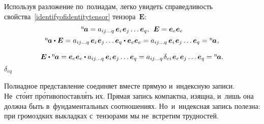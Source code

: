 \begin{otherlanguage}{russian}
Используя разложение по~полиадам, легко увидеть справедливость свойства~\eqref{identifyofidentitytensor}  тензора~$\bm{E}$:
\vspace{0.1em}\[\begin{array}{c}
{^\mathrm{n}\hspace{-0.2ex}\bm{a}} = a_{ij \ldots q} \hspace{0.4ex} \bm{e}_i \hspace{0.2ex} \bm{e}_j \ldots \bm{e}_q , \;\,  \bm{E} = \bm{e}_e \bm{e}_e
\\[.4em]
%
{^\mathrm{n}\hspace{-0.2ex}\bm{a}} \dotp \bm{E} = a_{ij \ldots q} \hspace{0.4ex} \bm{e}_i \hspace{0.2ex} \bm{e}_j \ldots \tikzmark{BeginDeltaEQBrace} {\bm{e}_q \dotp \bm{e}_e} \tikzmark{EndDeltaEQBrace} \bm{e}_e = a_{ij \ldots q} \hspace{0.4ex} \bm{e}_i \hspace{0.2ex} \bm{e}_j \ldots \bm{e}_q = {^\mathrm{n}\hspace{-0.2ex}\bm{a}} \hspace{0.1ex},
\\[1.1em]
%
\bm{E} \dotp {^\mathrm{n}\hspace{-0.2ex}\bm{a}} = \bm{e}_e \bm{e}_e \dotp a_{ij \ldots q} \hspace{0.4ex} \bm{e}_i \hspace{0.2ex} \bm{e}_j \ldots \bm{e}_q = a_{ij \ldots q} \hspace{0.2ex} \delta_{ei} \hspace{0.2ex} \bm{e}_e \hspace{0.2ex} \bm{e}_j \ldots \bm{e}_q = {^\mathrm{n}\hspace{-0.2ex}\bm{a}}.
\end{array}\]
%
{${\scriptstyle \delta_{eq}}$}

\vspace{-0.5em} Полиадное представление соединяет вместе прямую и~индексную записи. Не~ст\'{о}ит пр\'{о}тиво\-постав\-л\'{я}ть их. Прямая запись компактна, изящна, и~лишь она должна быть в~фундаментальных соотношениях. Но~и~индексная запись полезна: при громоздких выкладках с~тензорами мы не~встретим трудностей.

\end{otherlanguage}


